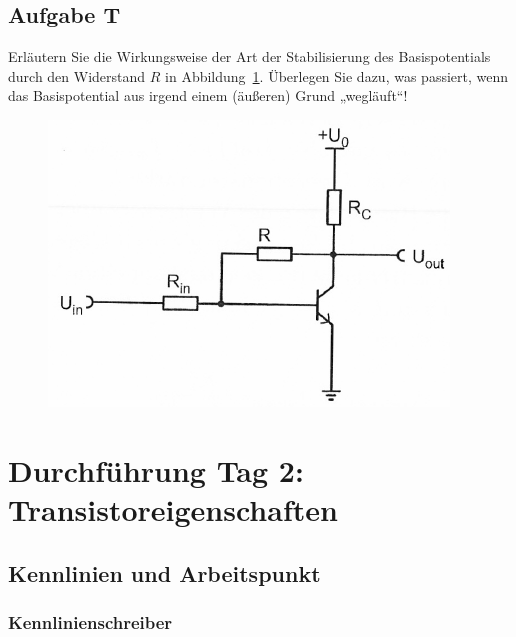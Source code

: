 \fehlt

\FloatBarrier
\subsection{Aufgabe T}

\begin{problem}
	Erläutern Sie die Wirkungsweise der Art der Stabilisierung des
	Basispotentials durch den Widerstand $R$ in Abbildung~\ref{fig:3_4-16}.
	Überlegen Sie dazu, was passiert, wenn das Basispotential aus irgend einem
	(äußeren) Grund „wegläuft“!
\end{problem}

\begin{figure}[htbp]
	\centering
	\includegraphics[width=.6\textwidth]{Anleitung/3_4-16.png}
	\caption{%
		\cite[Abbildung~3/4.16]{physik313-Anleitung}
	}
	\label{fig:3_4-16}
\end{figure}

\fehlt


\FloatBarrier
\section{Durchführung Tag 2: Transistoreigenschaften}

\FloatBarrier
\subsection{Kennlinien und Arbeitspunkt}

\subsubsection{Kennlinienschreiber}

